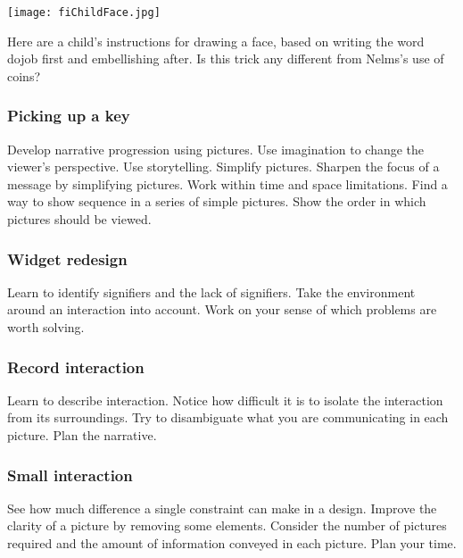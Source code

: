 \begin{center}
\texttt{[image: fiChildFace.jpg]}
\end{center}

Here are a child's instructions for drawing a face, based on writing the
word dojob first and embellishing after. Is this trick any different
from Nelms's use of coins?

\hypertarget{picking-up-a-key-1}{%
\subsubsection{Picking up a key}\label{picking-up-a-key-1}}

Develop narrative progression using pictures. Use imagination to change
the viewer's perspective. Use storytelling. Simplify pictures. Sharpen
the focus of a message by simplifying pictures. Work within time and
space limitations. Find a way to show sequence in a series of simple
pictures. Show the order in which pictures should be viewed.

\hypertarget{widget-redesign-1}{%
\subsubsection{Widget redesign}\label{widget-redesign-1}}

Learn to identify signifiers and the lack of signifiers. Take the
environment around an interaction into account. Work on your sense of
which problems are worth solving.

\hypertarget{record-interaction-1}{%
\subsubsection{Record interaction}\label{record-interaction-1}}

Learn to describe interaction. Notice how difficult it is to isolate the
interaction from its surroundings. Try to disambiguate what you are
communicating in each picture. Plan the narrative.

\hypertarget{small-interaction}{%
\subsubsection{Small interaction}\label{small-interaction}}

See how much difference a single constraint can make in a design.
Improve the clarity of a picture by removing some elements. Consider the
number of pictures required and the amount of information conveyed in
each picture. Plan your time.

